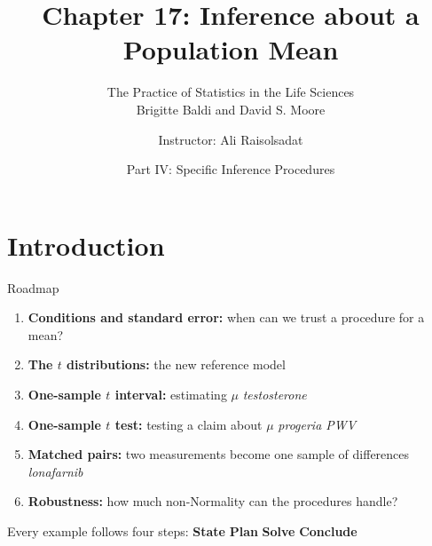 \documentclass[aspectratio=169,10pt]{beamer}
\title[Chapter 17: Inference about a Mean]{\textbf{Chapter 17: Inference about a Population Mean}}
\subtitle{The Practice of Statistics in the Life Sciences \\ Brigitte Baldi and David S. Moore}
\author{Instructor: Ali Raisolsadat}
\date{Part IV: Specific Inference Procedures}
\newcommand{\step}[1]{\textcolor{CourseBlue}{\textbf{#1}}\quad}
\begin{document}
\begin{frame}
  \titlepage
\end{frame}

\section{Introduction}

\begin{frame}{Roadmap}
\begin{enumerate}
  \setlength{\itemsep}{0.25cm}
  \item \textbf{Conditions and standard error:} when can we trust a procedure for a mean?
  \item \textbf{The $t$ distributions:} the new reference model
  \item \textbf{One-sample $t$ interval:} estimating $\mu$ \hfill \textit{testosterone}
  \item \textbf{One-sample $t$ test:} testing a claim about $\mu$ \hfill \textit{progeria PWV}
  \item \textbf{Matched pairs:} two measurements become one sample of differences \hfill \textit{lonafarnib}
  \item \textbf{Robustness:} how much non-Normality can the procedures handle?
\end{enumerate}

\vspace{0.4cm}
Every example follows four steps: \step{State} \step{Plan} \step{Solve} \textcolor{CourseBlue}{\textbf{Conclude}}
\end{frame}
\end{document}

